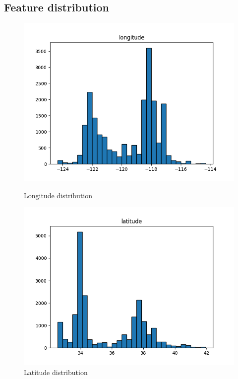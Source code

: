\documentclass[a4paper, 11pt]{article}
\begin{document}
\subsection{Feature distribution}

\begin{figure}[htbp]
    \centering
    \begin{minipage}{0.45\textwidth}
        \centering
        \includegraphics[width=\linewidth]{figs/longitude_distribution.png}
        \caption{Longitude distribution}
        \label{fig:longitude_distribution}
    \end{minipage}\hfill
    \begin{minipage}{0.45\textwidth}
        \centering
        \includegraphics[width=\linewidth]{figs/latitude_distribution.png}
        \caption{Latitude distribution}
        \label{fig:latitude_distribution}
    \end{minipage}
    

\end{figure}
\end{document}
